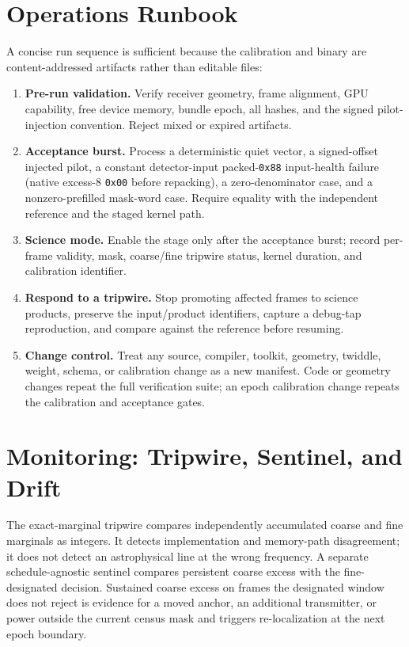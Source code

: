 \section{Operations Runbook}
\label{sec:deployment:runbook}

A concise run sequence is sufficient because the calibration and binary are
content-addressed artifacts rather than editable files:

\begin{enumerate}[leftmargin=2em]
  \item \textbf{Pre-run validation.} Verify receiver geometry, frame alignment,
  GPU capability, free device memory, bundle epoch, all hashes, and the signed
  pilot-injection convention.  Reject mixed or expired artifacts.
  \item \textbf{Acceptance burst.} Process a deterministic quiet vector, a
  signed-offset injected pilot, a constant detector-input packed-\texttt{0x88}
  input-health failure (native excess-8 \texttt{0x00} before repacking), a
  zero-denominator case, and a nonzero-prefilled mask-word case.
  Require equality with the independent reference and the staged kernel path.
  \item \textbf{Science mode.} Enable the stage only after the acceptance burst;
  record per-frame validity, mask, coarse/fine tripwire status, kernel duration,
  and calibration identifier.
  \item \textbf{Respond to a tripwire.} Stop promoting affected frames to science
  products, preserve the input/product identifiers, capture a debug-tap
  reproduction, and compare against the reference before resuming.
  \item \textbf{Change control.} Treat any source, compiler, toolkit, geometry,
  twiddle, weight, schema, or calibration change as a new manifest.  Code or
  geometry changes repeat the full verification suite; an epoch calibration
  change repeats the calibration and acceptance gates.
\end{enumerate}

\section{Monitoring: Tripwire, Sentinel, and Drift}
\label{sec:deployment:monitoring}

The exact-marginal tripwire compares independently accumulated coarse and fine
marginals as integers.  It detects implementation and memory-path disagreement;
it does not detect an astrophysical line at the wrong frequency.  A separate
schedule-agnostic sentinel compares persistent coarse excess with the
fine-designated decision.  Sustained coarse excess on frames the designated
window does not reject is evidence for a moved anchor, an additional transmitter,
or power outside the current census mask and triggers re-localization at the
next epoch boundary.

